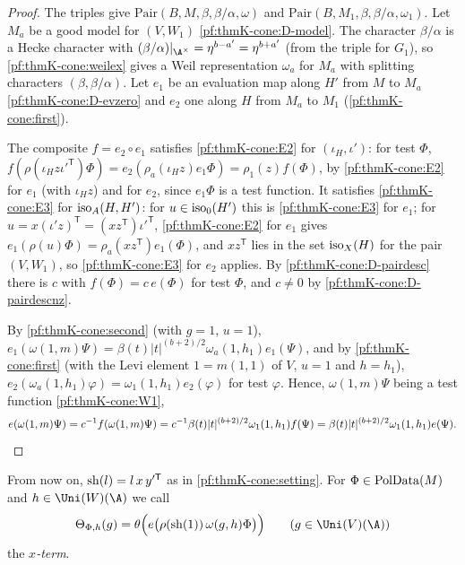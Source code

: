 \begin{proof}
The triples give $\mathrm{Pair}(B,M,\beta,\beta/\alpha,\omega)$ and $\mathrm{Pair}(B,M_1,\beta,\beta/\alpha,\omega_1)$.  Let
$M_a$ be a good model for $(V,W_1)$ \ref{pf:thmK-cone:D-model}.  The character $\beta/\alpha$ is a Hecke character with
$(\beta/\alpha)|_{\A^\times}=\eta^{b-a'}=\eta^{b+a'}$ (from the triple for $G_1$), so \cref{pf:thmK-cone:weilex} gives a
Weil representation $\omega_a$ for $M_a$ with splitting characters $(\beta,\beta/\alpha)$.  Let $e_1$ be an
evaluation map along $H'$ from $M$ to $M_a$ \ref{pf:thmK-cone:D-evzero} and $e_2$ one along $H$ from $M_a$ to $M_1$
(\cref{pf:thmK-cone:first}).

The composite $f=e_2\circ e_1$ satisfies \ref{pf:thmK-cone:E2} for $(\iota_H,\iota')$: for test $\Phi$,
$f(\rho(\iota_Hz\iota'^{\mathsf T})\Phi)=e_2(\rho_a(\iota_Hz)e_1\Phi)=\rho_1(z)f(\Phi)$, by \ref{pf:thmK-cone:E2} for
$e_1$ (with $\iota_Hz$) and for $e_2$, since $e_1\Phi$ is a test function.  It satisfies \ref{pf:thmK-cone:E3} for
$\operatorname{iso}_A(H,H')$: for $u\in\operatorname{iso}_0(H')$ this is \ref{pf:thmK-cone:E3} for $e_1$; for
$u=x(\iota'z)^{\mathsf T}=(xz^{\mathsf T})\iota'^{\mathsf T}$, \ref{pf:thmK-cone:E2} for $e_1$ gives
$e_1(\rho(u)\Phi)=\rho_a(xz^{\mathsf T})e_1(\Phi)$, and $xz^{\mathsf T}$ lies in the set $\operatorname{iso}_X(H)$ for the pair
$(V,W_1)$, so \ref{pf:thmK-cone:E3} for $e_2$ applies.  By \ref{pf:thmK-cone:D-pairdesc} there is $c$ with $f(\Phi)=c\,e(\Phi)$ for test $\Phi$, and $c\neq0$
by \ref{pf:thmK-cone:D-pairdescnz}.

By \cref{pf:thmK-cone:second} (with $g=1$, $u=1$), $e_1(\omega(1,m)\Psi)=\beta(t)|t|^{(b+2)/2}\omega_a(1,h_1)e_1(\Psi)$,
and by \cref{pf:thmK-cone:first} (with the Levi element $1=m(1,1)$ of $V$, $u=1$ and $h=h_1$),
$e_2(\omega_a(1,h_1)\varphi)=\omega_1(1,h_1)e_2(\varphi)$ for test $\varphi$.  Hence, $\omega(1,m)\Psi$ being a test
function \ref{pf:thmK-cone:W1},
\[
  e(\omega(1,m)\Psi)=c^{-1}f(\omega(1,m)\Psi)=c^{-1}\beta(t)|t|^{(b+2)/2}\omega_1(1,h_1)f(\Psi)
  =\beta(t)|t|^{(b+2)/2}\omega_1(1,h_1)e(\Psi).\qedhere
\]
\end{proof}

From now on, $\operatorname{sh}(l)=l\,x\,y'^{\mathsf T}$ as in \cref{pf:thmK-cone:setting}.  For
$\Phi\in\operatorname{PolData}(M)$ and $h\in\Uni(W)(\A)$ we call
\begin{equation}\label{pf:thmK-cone:eq-xterm}
  \Theta_{\Phi,h}(g)=\theta\Bigl(e\bigl(\rho(\thmKconeshift(1))\,\omega(g,h)\Phi\bigr)\Bigr)\qquad(g\in\Uni(V)(\A))
\end{equation}
the \emph{$x$-term}.

